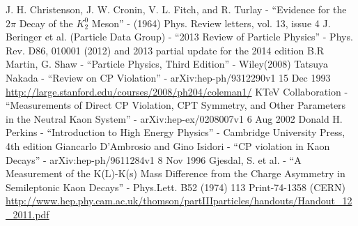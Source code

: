 \documentclass[floatfix,aps,prd,amsmath,amssymb]{revtex4}
\begin{document}
\begin{thebibliography}{10}
J. H. Christenson, J. W. Cronin, V. L. Fitch, and R. Turlay - ``Evidence for the $2 \pi$ Decay of the $K^0_2$ Meson'' - (1964) Phys. Review letters, vol. 13, issue 4
J. Beringer et al. (Particle Data Group) - ``2013 Review of Particle Physics'' - Phys. Rev. D86, 010001 (2012) and 2013 partial update for the 2014 edition 
B.R Martin, G. Shaw - ``Particle Physics, Third Edition'' - Wiley(2008)  
Tatsuya Nakada - ``Review on CP Violation'' - arXiv:hep-ph/9312290v1 15 Dec 1993
\url{http://large.stanford.edu/courses/2008/ph204/coleman1/}  
KTeV Collaboration - ``Measurements of Direct CP Violation, CPT Symmetry, and Other Parameters in the Neutral Kaon System'' - arXiv:hep-ex/0208007v1 6 Aug 2002 
Donald H. Perkins - ``Introduction to High Energy Physics'' - Cambridge University Press, 4th edition 
Giancarlo D’Ambrosio and Gino Isidori - ``CP violation in Kaon Decays'' - arXiv:hep-ph/9611284v1 8 Nov 1996
Gjesdal, S. et al. - ``A Measurement of the K(L)-K(s) Mass Difference from the Charge Asymmetry in Semileptonic Kaon Decays'' - Phys.Lett. B52 (1974) 113 Print-74-1358 (CERN) 
\url{http://www.hep.phy.cam.ac.uk/thomson/partIIIparticles/handouts/Handout\_12\_2011.pdf}


\end{thebibliography}
\end{document}
